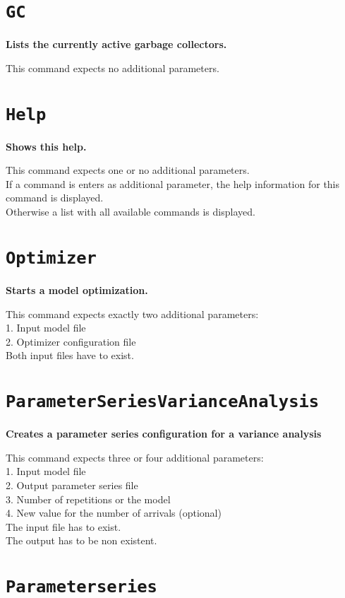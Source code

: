\section{\texttt{GC}}

\textbf{Lists the currently active garbage collectors.}

This command expects no additional parameters.

\section{\texttt{Help}}

\textbf{Shows this help.}

This command expects one or no additional parameters.\\
If a command is enters as additional parameter, the help information for this command is displayed.\\
Otherwise a list with all available commands is displayed.

\section{\texttt{Optimizer}}

\textbf{Starts a model optimization.}

This command expects exactly two additional parameters:\\
1. Input model file\\
2. Optimizer configuration file\\
Both input files have to exist.

\section{\texttt{ParameterSeriesVarianceAnalysis}}

\textbf{Creates a parameter series configuration for a variance analysis}

This command expects three or four additional parameters:\\
1. Input model file\\
2. Output parameter series file\\
3. Number of repetitions or the model\\
4. New value for the number of arrivals (optional)\\
The input file has to exist.\\
The output has to be non existent.

\section{\texttt{Parameterseries}}

